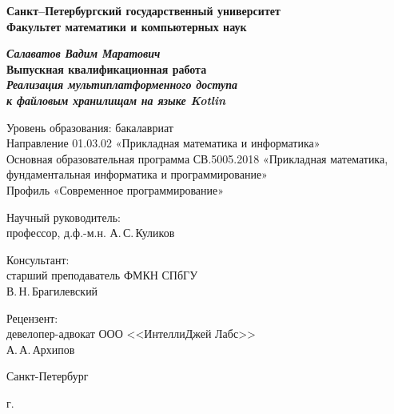 \begin{titlepage}
\begin{center}

\textbf{Санкт--Петербургский государственный университет}\\
\textbf{Факультет математики и компьютерных наук}


\vspace{35mm}

\textbf{\textit{\large Салаватов Вадим Маратович}} \\[8mm]
\textbf{\large Выпускная квалификационная работа}\\[3mm]
\textbf{\textit{\large Реализация мультиплатформенного доступа\\ к файловым хранилищам на языке Kotlin}}

\vspace{20mm}
Уровень образования: бакалавриат\\
Направление 01.03.02 «Прикладная математика и информатика»\\
Основная образовательная программа СВ.5005.2018
«Прикладная математика, фундаментальная информатика и программирование»\\
Профиль «Современное программирование»\\[16mm]


\begin{flushright}
\begin{minipage}[t]{0.65\textwidth}
{Научный руководитель:} \\
профессор, д.ф.-м.н. А.\,С.\,Куликов
\vspace{4mm}

{Консультант:} \\
старший преподаватель ФМКН СПбГУ\\
В.\,Н.\,Брагилевский
\vspace{4mm}

{Рецензент:} \\
девелопер-адвокат ООО <<ИнтеллиДжей Лабс>>\\ А.\,А.\,Архипов
\end{minipage}
\end{flushright}

\vfill

{Санкт-Петербург}
\par{\the\year{} г.}
\end{center}
\end{titlepage}
\restoregeometry
\addtocounter{page}{1}
